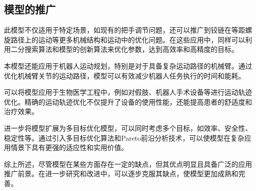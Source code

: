 \documentclass[withoutpreface, bwprint]{cumcmthesis} %
\begin{document}
\subsection{模型的推广}

此模型不仅适用于特定场景，如现有的把手调节问题，还可以推广到铰链在等距螺旋路径上的运动等更多机械结构和运动中的优化问题。在这些应用中，同样可以利用二分搜索算法和模型的创新算法来优化参数，达到高效率和高精度的目标。


本模型还能应用于机器人运动规划，特别是对于具备复杂运动路径的机械臂。通过优化机械臂关节的运动路径，模型可以有效减少机器人任务执行的时间和能耗。

可以将模型应用于生物医学工程中，例如对假肢、机器人手术设备等进行运动轨迹优化。精确的运动轨迹优化不仅提升了设备的使用性能，还能提高患者的舒适度和治疗效果。

进一步将模型扩展为多目标优化模型，可以同时考虑多个目标，如效率、安全性、稳定性等。通过引入多目标优化算法和Pareto前沿分析技术，可以使模型在复杂应用情景下具有更强的适应性和实用价值。

综上所述，尽管模型在某些方面存在一定的缺点，但其优点明显且具备广泛的应用推广前景。在进一步研究和改进中，可以逐步克服其缺点，使模型更加成熟和完善。





\newpage
\begin{appendices}

    

\end{appendices}
\end{document}
